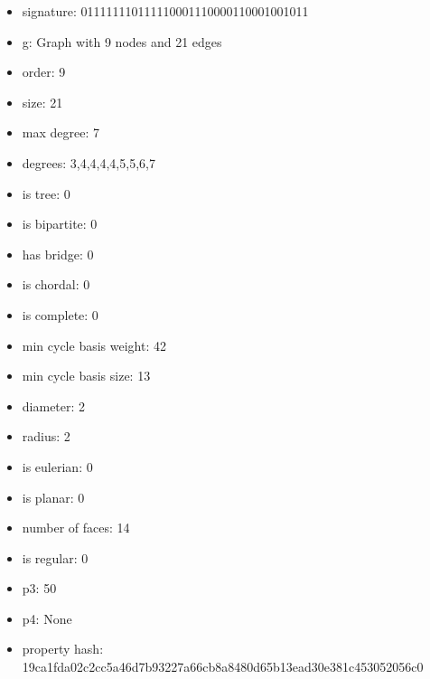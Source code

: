 \newpage
\begin{figure}
\end{figure}
\begin{itemize}
\item signature: 011111110111110001110000110001001011
\item g: Graph with 9 nodes and 21 edges
\item order: 9
\item size: 21
\item max degree: 7
\item degrees: 3,4,4,4,4,5,5,6,7
\item is tree: 0
\item is bipartite: 0
\item has bridge: 0
\item is chordal: 0
\item is complete: 0
\item min cycle basis weight: 42
\item min cycle basis size: 13
\item diameter: 2
\item radius: 2
\item is eulerian: 0
\item is planar: 0
\item number of faces: 14
\item is regular: 0
\item p3: 50
\item p4: None
\item property hash: 19ca1fda02c2cc5a46d7b93227a66cb8a8480d65b13ead30e381c453052056c0
\end{itemize}
